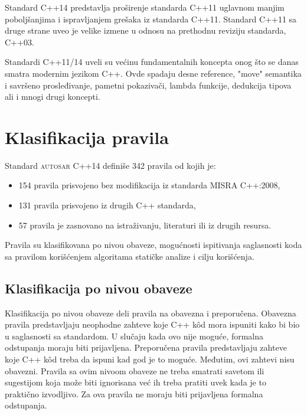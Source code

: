 \documentclass[12pt,oneside]{memoir}
\begin{document}
Standard C++14 predstavlja pro\v{s}irenje standarda C++11 uglavnom manjim pobolj\v{s}anjima i ispravljanjem gre\v{s}aka iz standarda C++11. Standard C++11 sa druge strane uveo je velike izmene u odnosu na prethodnu reviziju standarda, C++03. \par
Standardi C++11/14 uveli su ve\'{c}inu fundamentalnih koncepta onog \v{s}to se danas smatra modernim jezikom C++. Ovde spadaju desne reference, "move" semantika i savr\v{s}eno prosleđivanje, pametni pokaziva\v{c}i, lambda funkcije, dedukcija tipova ali i mnogi drugi koncepti.

\section{Klasifikacija pravila}
Standard \textsc{autosar} C++14 definiše 342 pravila od kojih je:
\begin{itemize}
  \item {154 pravila prisvojeno bez modifikacija iz standarda MISRA C++:2008,}
  \item {131 pravila prisvojeno iz drugih C++ standarda,}
  \item {57 pravila je zasnovano na istraživanju, literaturi ili iz drugih resursa.}
\end{itemize}
Pravila su klasifikovana po nivou obaveze, mogućnosti ispitivanja saglasnosti koda sa pravilom korišćenjem algoritama
statičke analize i cilju korišćenja.

\subsection{Klasifikacija po nivou obaveze}
Klasifikacija po nivou obaveze deli pravila na obavezna i preporučena.
Obavezna pravila predstavljaju neophodne zahteve koje C++ k\^{o}d mora ispuniti kako bi bio u saglasnosti sa standardom. U slučaju kada ovo nije moguće,
formalna odstupanja moraju biti prijavljena.
Preporučena pravila predstavljaju zahteve koje C++ k\^{o}d treba da ispuni kad god je to mogu\'{c}e. Međutim, ovi zahtevi nisu obavezni. Pravila
sa ovim nivoom obaveze ne treba smatrati savetom ili sugestijom koja može biti ignorisana ve\'{c} ih treba pratiti uvek kada je to prakti\v{c}no izvodljivo. Za ova pravila ne moraju biti prijavljena formalna odstupanja.
\end{document}
